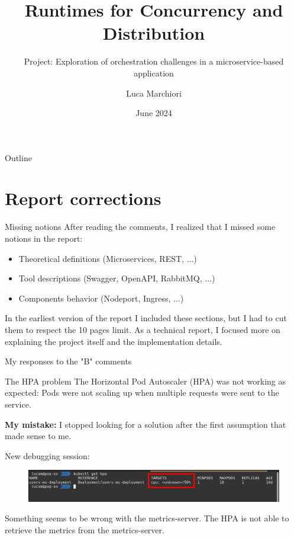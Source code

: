 \documentclass{beamer}
\title{Runtimes for Concurrency and Distribution}
\subtitle{Project: Exploration of orchestration challenges in a microservice-based application}
\author{Luca Marchiori}
\date{June 2024}
\begin{document}
\maketitle

\begin{frame}{Outline}
	\tableofcontents
\end{frame}


\section{Report corrections}


\begin{frame}{Missing notions}
	After reading the comments, I realized that I missed some notions in the report:
	\begin{itemize}
		\item Theoretical definitions (Microservices, REST, ...)
		\item Tool descriptions (Swagger, OpenAPI, RabbitMQ, ...)
		\item Components behavior (Nodeport, Ingress, ...)
	\end{itemize}
		
	In the earliest version of the report I included these sections, but I had to cut them to respect the 10 pages limit.
	\newline
	\newline
	As a technical report, I focused more on explaining the project itself and the implementation details.
\end{frame}


\begin{frame}
	\begin{center}
		\huge{My responses to the "B" comments}
	\end{center}
\end{frame}


\begin{frame}{The HPA problem}
The Horizontal Pod Autoscaler (HPA) was not working as expected: Pods were not scaling up when multiple requests were sent to the service.
\begin{block}{}
	\textbf{My mistake:} I stopped looking for a solution after the first assumption that made sense to me.
\end{block}
New debugging session:
\begin{figure}
	\centering
	\includegraphics[width=1\linewidth]{./images/hpaProblem.png}
\end{figure}
Something seems to be wrong with the metrics-server. The HPA is not able to retrieve the metrics from the metrics-server.
\end{frame}
\end{document}
